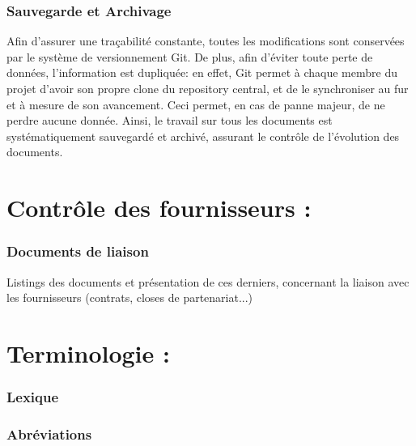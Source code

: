 \documentclass[a4paper, 18pt]{article}
\begin{document}
\section{Sauvegarde et Archivage}

Afin d'assurer une traçabilité constante, toutes les modifications sont conservées par le système de versionnement
Git. De plus, afin d'éviter toute perte de données, l'information est dupliquée: en effet, Git permet à chaque membre
du projet d'avoir son propre clone du repository central, et de le synchroniser au fur et à mesure de son avancement.
Ceci permet, en cas de panne majeur, de ne perdre aucune donnée. Ainsi, le travail sur tous les documents est
systématiquement sauvegardé et archivé, assurant le contrôle de l'évolution des documents.

\part{Contrôle des fournisseurs :}

\section{Documents de liaison}

Listings des documents et présentation de ces derniers, concernant la liaison avec les fournisseurs (contrats, closes de partenariat...)

\part{Terminologie :}

\section{Lexique}

\section{Abréviations} 
\end{document}
